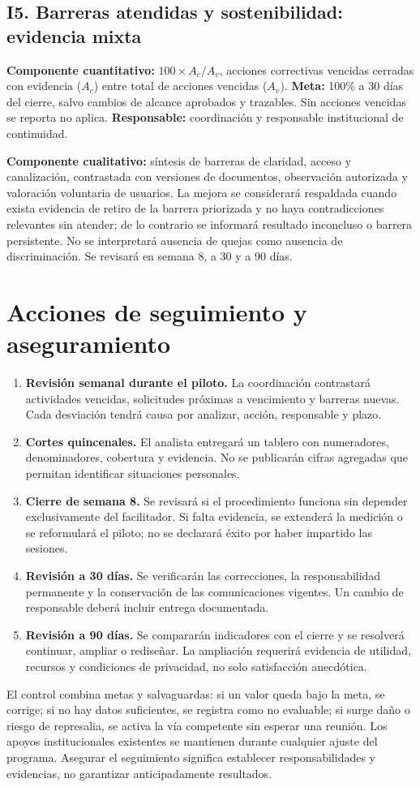 \documentclass[12pt,letterpaper,oneside]{article}
\begin{document}
\subsection{I5. Barreras atendidas y sostenibilidad: evidencia mixta}
\textbf{Componente cuantitativo:} $100\times A_c/A_v$, acciones correctivas vencidas cerradas con evidencia ($A_c$) entre total de acciones vencidas ($A_v$). \textbf{Meta:} 100\% a 30 días del cierre, salvo cambios de alcance aprobados y trazables. Sin acciones vencidas se reporta no aplica. \textbf{Responsable:} coordinación y responsable institucional de continuidad.

\textbf{Componente cualitativo:} síntesis de barreras de claridad, acceso y canalización, contrastada con versiones de documentos, observación autorizada y valoración voluntaria de usuarios. La mejora se considerará respaldada cuando exista evidencia de retiro de la barrera priorizada y no haya contradicciones relevantes sin atender; de lo contrario se informará resultado inconcluso o barrera persistente. No se interpretará ausencia de quejas como ausencia de discriminación. Se revisará en semana 8, a 30 y a 90 días.

\section{Acciones de seguimiento y aseguramiento}
\begin{enumerate}
\item \textbf{Revisión semanal durante el piloto.} La coordinación contrastará actividades vencidas, solicitudes próximas a vencimiento y barreras nuevas. Cada desviación tendrá causa por analizar, acción, responsable y plazo.
\item \textbf{Cortes quincenales.} El analista entregará un tablero con numeradores, denominadores, cobertura y evidencia. No se publicarán cifras agregadas que permitan identificar situaciones personales.
\item \textbf{Cierre de semana 8.} Se revisará si el procedimiento funciona sin depender exclusivamente del facilitador. Si falta evidencia, se extenderá la medición o se reformulará el piloto; no se declarará éxito por haber impartido las sesiones.
\item \textbf{Revisión a 30 días.} Se verificarán las correcciones, la responsabilidad permanente y la conservación de las comunicaciones vigentes. Un cambio de responsable deberá incluir entrega documentada.
\item \textbf{Revisión a 90 días.} Se compararán indicadores con el cierre y se resolverá continuar, ampliar o rediseñar. La ampliación requerirá evidencia de utilidad, recursos y condiciones de privacidad, no solo satisfacción anecdótica.
\end{enumerate}
El control combina metas y salvaguardas: si un valor queda bajo la meta, se corrige; si no hay datos suficientes, se registra como no evaluable; si surge daño o riesgo de represalia, se activa la vía competente sin esperar una reunión. Los apoyos institucionales existentes se mantienen durante cualquier ajuste del programa. Asegurar el seguimiento significa establecer responsabilidades y evidencias, no garantizar anticipadamente resultados.
\end{document}
